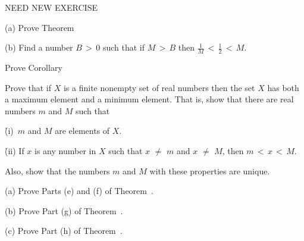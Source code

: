 \V
\V

\noindent \ExBk NEED NEW EXERCISE


\V
\V

\noindent \ExBl (a) Prove Theorem~ %

\V

        (b) Find a number $B\,>\,0$ such that if $M\,>\,B$ then ${\displaystyle \frac{1}{M}\,<\,\frac{1}{2}\,<\,M}$.

\V
\V

\noindent \ExBm Prove Corollary~ %

\V
\V

\noindent \ExBn Prove that if $X$ is a finite nonempty set of real numbers then the set $X$ has both a maximum element and a minimum element.
    That is, show that there are real numbers $m$ and $M$ such that

        \h (i)\, $m$ and $M$ are elements of $X$.

        \h (ii) If $x$ is any number in $X$ such that $x \,\,{\neq}\,\, m$ and $x \,\,{\neq}\,\, M$, then  $m\,<\,x\,<\,M$.

\noindent Also, show that the numbers $m$ and $M$ with these properties are unique.

\V
\V

\noindent \ExBo
        (a) Prove Parts (e) and (f) of Theorem~. 

\V

        (b) Prove Part (g) of Theorem~.

\V

        (c) Prove Part (h) of Theorem~.
        
